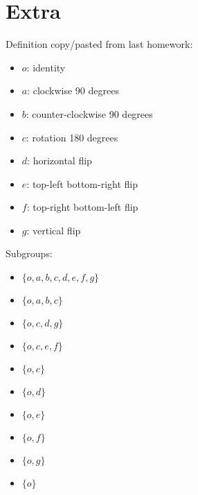 \documentclass{article}
\begin{document}
\section*{Extra}
Definition copy/pasted from last homework:
\begin{itemize}
\item $o$: identity
\item $a$: clockwise 90 degrees
\item $b$: counter-clockwise 90 degrees
\item $c$: rotation 180 degrees
\item $d$: horizontal flip
\item $e$: top-left bottom-right flip
\item $f$: top-right bottom-left flip
\item $g$: vertical flip
\end{itemize}
Subgroups:
\begin{itemize}
\item $\{o,a,b,c,d,e,f,g\}$
\item $\{o,a,b,c\}$
\item $\{o,c,d,g\}$
\item $\{o,c,e,f\}$
\item $\{o,c\}$
\item $\{o,d\}$
\item $\{o,e\}$
\item $\{o,f\}$
\item $\{o,g\}$
\item$\{o\}$  
\end{itemize}
\end{document}
